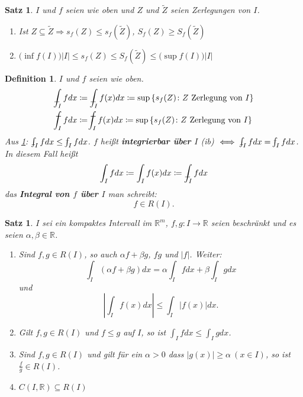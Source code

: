 \documentclass[12pt]{extreport} %
\newcommand{\R}{\mathbb{R}}
\theoremstyle{named}
\theoremstyle{nnamed}
\theoremstyle{itshape}
\newtheorem{satz}[unnamedtheorem]{Satz}
\newtheorem*{definition}{Definition}
\theoremstyle{normal}
\begin{document}
\begin{satz} \label{20.1:satz}
	$I$ und $f$ seien wie oben und $Z$ und $\tilde{Z}$ seien Zerlegungen von $I$.
	\begin{enumerate}
		\item Ist $Z \subseteq \tilde{Z} \Rightarrow s_{f}(Z) \leq s_{f}(\tilde{Z})$, $S_{f}(Z) \geq S_{f}(\tilde{Z})$
		\item $\big( \inf f(I) \big) \left| I \right| \leq s_{f}(Z) \leq S_{f}(\tilde{Z}) \leq \big( \sup f(I) \big) \left|I \right|$
	\end{enumerate}
\end{satz}

 
\begin{definition}
	$I$ und $f$ seien wie oben.
	\begin{align*}
	\lowdashint_{I} f dx & \coloneqq \lowdashint_{I} f(x) dx \coloneqq \sup \left\{ s_{f}(Z) \colon Z \text{ Zerlegung von } I \right\} \\
		\highdashint_{I} f dx & \coloneqq \highdashint_{I} f(x) dx \coloneqq \sup \left\{ s_{f}(Z) \colon Z \text{ Zerlegung von } I \right\}
	\end{align*}
	Aus \ref{20.1:satz}: $\lowdashint_{I} f dx \leq \highdashint_{I} f dx$. $f$ hei{\ss}t \textbf{integrierbar über $I$} (ib) $\iff \lowdashint_{I} f dx = \highdashint_{I} f dx$. In diesem Fall hei{\ss}t
		$$ \int_{I} f dx \coloneqq \int_{I} f(x) dx \coloneqq \lowdashint_{I} f dx $$
	das \textbf{Integral von $f$ über $I$} man schreibt:
		$$ f \in R(I). $$
\end{definition}


\begin{satz} \label{20.2:satz}
	$I$ sei ein kompaktes Intervall im $\R^{m}$, $f, g  \colon I \rightarrow \R$ seien beschränkt und es seien $\alpha, \beta \in \R$.
	\begin{enumerate}
		\item Sind $f, g \in R(I)$, so auch $\alpha f + \beta g$, $f g$ und $|f|$. Weiter:
			$$ \int_{I} (\alpha f + \beta g) dx = \alpha \int_{I} f dx + \beta \int_{I} g dx $$
			und
			$$ \left| \int_{I} f(x) dx \right| \leq \int_{I} |f(x)| dx. $$
		\item Gilt $f, g \in R(I)$ und $f \leq g$ auf $I$, so ist $\int_{I} f dx \leq \int_{I} g dx$.
		\item Sind $f, g \in R(I)$ und gilt für ein $\alpha > 0$ dass $|g(x)| \geq \alpha ~(x \in I)$, so ist $\frac{f}{g} \in R(I)$.
		\item $C(I, \R) \subseteq R(I)$
	\end{enumerate}
\end{satz}
\end{document}
